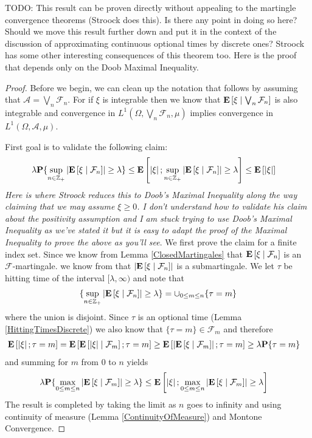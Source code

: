 TODO: This result can be proven directly without appealing to the martingle
convergence theorems (Stroock does this).  Is there any point in doing
so here?  Should we move this result further down and put it in the
context of the discussion of approximating continuous optional times
by discrete ones?  Stroock has some other interesting consequences of
this theorem too.
Here is the proof that depends only on the Doob Maximal Inequality.
\begin{proof}
Before we begin, we can clean up the notation that follows by assuming
that $\mathcal{A} = \bigvee_n \mathcal{F}_n$.  For if $\xi$ is
integrable then we know that
$\textbf{E}\left[ \xi \mid \bigvee_n \mathcal{F}_n \right]$ is also integrable
and convergence in $L^1(\Omega, \bigvee_n \mathcal{F}_n, \mu)$
implies convergence in $L^1(\Omega, \mathcal{A}, \mu)$.

First goal is to validate the following claim:
\begin{align*}
\lambda \textbf{P}\{\sup_{n \in \mathbb{Z}_+}
  \left \vert \textbf{E}\left[ \xi \mid \mathcal{F}_n \right] \right \vert \geq \lambda\} &\leq
\textbf{E}\left[ \left \vert \xi \right \vert ; \sup_{n \in \mathbb{Z}_+}
  \left \vert \textbf{E}\left[ \xi \mid \mathcal{F}_n \right] \right \vert \geq \lambda\right]  \leq \textbf{E}\left[\left \vert \xi \right \vert\right]
\end{align*}
\emph{Here is where Stroock reduces this to Doob's Maximal Inequality
  along the way claiming that we may assume $\xi \geq 0$.  I don't
  understand how to validate his claim about the positivity assumption
  and I am stuck trying to use
  Doob's Maximal Inequality as we've stated it but it is easy to adapt the proof of the
  Maximal Inequality to prove the above as you'll see}.
We first prove the claim for a finite index set.  Since we 
know from Lemma \ref{ClosedMartingales} that
$\textbf{E}\left[ \xi \mid \mathcal{F}_n \right]$ is an
$\mathcal{F}$-martingale. we know from
that $\left \vert \textbf{E}\left[ \xi \mid \mathcal{F}_n \right] \right \vert$ is a
submartingale.  We let $\tau$ be hitting time of the interval
$[\lambda, \infty)$ and note that 
\begin{align*}
\lbrace \sup_{n \in \mathbb{Z}_+}
  \left \vert \textbf{E}\left[ \xi \mid \mathcal{F}_n \right] \right \vert \geq \lambda \rbrace =
  \cup_{0 \leq m \leq n} \lbrace \tau = m \rbrace
\end{align*}
where the union is disjoint.  Since $\tau$ is an optional time
(Lemma \ref{HittingTimesDiscrete}) we also know that $\lbrace \tau =
m \rbrace \in \mathcal{F}_m$ and therefore
\begin{align*}
\textbf{E}\left[\left \vert \xi \right \vert ; \tau = m\right] &= 
\textbf{E}\left[\textbf{E}\left[ \left \vert \xi \right \vert \mid \mathcal{F}_m \right] ; \tau =  m\right] \geq 
\textbf{E}\left[\left \vert \textbf{E}\left[ \xi \mid \mathcal{F}_m \right] \right \vert ; \tau =  m\right]
\geq 
\lambda \textbf{P}\{\tau = m\}
\end{align*}
and summing for $m$ from 0 to $n$ yields
\begin{align*}
\lambda \textbf{P}\{\max_{0 \leq m \leq n}
  \left \vert \textbf{E}\left[ \xi \mid \mathcal{F}_m \right] \right \vert \geq \lambda\} &\leq
\textbf{E}\left[ \left \vert \xi \right \vert ; \max_{0 \leq m \leq n}
  \left \vert \textbf{E}\left[ \xi \mid \mathcal{F}_m \right] \right \vert \geq \lambda\right] 
\end{align*}
The result is completed by taking the limit as $n$ goes to infinity
and using continuity of measure (Lemma \ref{ContinuityOfMeasure}) and
Montone Convergence.


\end{proof}
